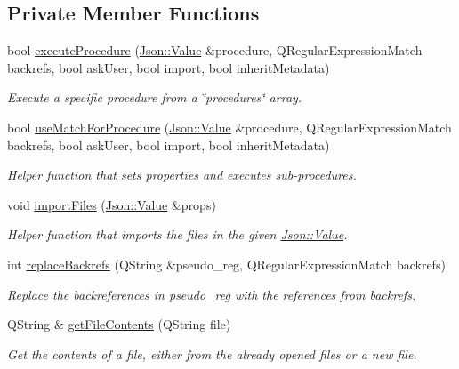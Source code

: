 \subsection*{Private Member Functions}
\begin{DoxyCompactItemize}
\item 
bool \hyperlink{class_a_w_e_1_1_j_s_o_n_scraper_aefc9dd0f99a2adab9b595ef3b3582c8b}{execute\-Procedure} (\hyperlink{class_json_1_1_value}{Json\-::\-Value} \&procedure, Q\-Regular\-Expression\-Match backrefs, bool ask\-User, bool import, bool inherit\-Metadata)
\begin{DoxyCompactList}\small\item\em Execute a specific procedure from a {\ttfamily \char`\"{}procedures\char`\"{}} array. \end{DoxyCompactList}\item 
bool \hyperlink{class_a_w_e_1_1_j_s_o_n_scraper_a575f13fe24c45ea6a06d61569ed22fe7}{use\-Match\-For\-Procedure} (\hyperlink{class_json_1_1_value}{Json\-::\-Value} \&procedure, Q\-Regular\-Expression\-Match backrefs, bool ask\-User, bool import, bool inherit\-Metadata)
\begin{DoxyCompactList}\small\item\em Helper function that sets properties and executes sub-\/procedures. \end{DoxyCompactList}\item 
void \hyperlink{class_a_w_e_1_1_j_s_o_n_scraper_a339670a46a5b55b1c59b3ddba5986742}{import\-Files} (\hyperlink{class_json_1_1_value}{Json\-::\-Value} \&props)
\begin{DoxyCompactList}\small\item\em Helper function that imports the files in the given {\ttfamily \hyperlink{class_json_1_1_value}{Json\-::\-Value}}. \end{DoxyCompactList}\item 
int \hyperlink{class_a_w_e_1_1_j_s_o_n_scraper_afb2118a214f52055259d4e214c147cf9}{replace\-Backrefs} (Q\-String \&pseudo\-\_\-reg, Q\-Regular\-Expression\-Match backrefs)
\begin{DoxyCompactList}\small\item\em Replace the backreferences in {\ttfamily pseudo\-\_\-reg} with the references from {\ttfamily backrefs}. \end{DoxyCompactList}\item 
Q\-String \& \hyperlink{class_a_w_e_1_1_j_s_o_n_scraper_a406666e30d724336826cdaae6ede7c8c}{get\-File\-Contents} (Q\-String file)
\begin{DoxyCompactList}\small\item\em Get the contents of a file, either from the already opened files or a new file. \end{DoxyCompactList}\item 

\end{DoxyCompactItemize}
